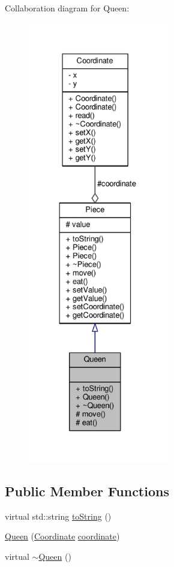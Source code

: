 Collaboration diagram for Queen\+:\nopagebreak
\begin{figure}[H]
\begin{center}
\leavevmode
\includegraphics[height=550pt]{class_queen__coll__graph}
\end{center}
\end{figure}
\subsection*{Public Member Functions}
\begin{DoxyCompactItemize}
\item 
virtual std\+::string \hyperlink{class_queen_a1cf5f21870e6b2ec107a9e3280a69da6}{to\+String} ()
\item 
\hyperlink{class_queen_ab0d98820ff74906af19e0b7495348f8b}{Queen} (\hyperlink{class_coordinate}{Coordinate} \hyperlink{class_piece_a9e92373c8fffc1f5efb20d62204b70cf}{coordinate})
\item 
virtual \hyperlink{class_queen_aa22f6c1a49a583b549bd1f940e50721d}{$\sim$\+Queen} ()
\end{DoxyCompactItemize}
